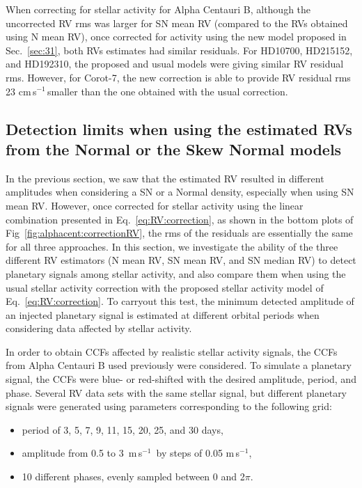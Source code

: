 \documentclass{aa}
\def\ms{\hbox{\,m\,s$^{-1}$}}         %
\def\cms{\hbox{\,cm\,s$^{-1}$}}       %
\begin{document}
When correcting for stellar activity for  Alpha Centauri B, although the uncorrected RV rms was larger for SN mean RV (compared to the RVs obtained using N mean RV), once corrected for activity using the new model proposed in Sec.~\ref{sec:31}, both RVs estimates had similar residuals. 
For HD10700, HD215152, and HD192310, the proposed and usual models were giving similar RV residual rms.
However, for Corot-7, the new correction is able to provide RV residual rms 23\,\cms\,smaller than the one obtained with the usual correction.






\subsection{Detection limits when using the estimated RVs from the Normal or the Skew Normal models} \label{sec:detect_limits}

In the previous section, we saw that the estimated RV resulted in different amplitudes when considering a SN or a Normal density, especially when using SN mean RV. 
However, once corrected for stellar activity using the linear combination presented in Eq.~\eqref{eq:RV:correction}, as shown in the bottom plots of Fig~\ref{fig:alphacent:correctionRV}, the rms of the residuals are essentially the same for all three approaches.
In this section, we investigate the ability of the three different RV estimators (N mean RV, SN mean RV, and SN median RV) to detect planetary signals among stellar activity, and also compare them when using the usual stellar activity correction with the proposed stellar activity model of Eq.~\eqref{eq:RV:correction}.
To carryout this test, the minimum detected amplitude of an injected planetary signal is estimated at different orbital periods when considering data affected by stellar activity.

In order to obtain CCFs affected by realistic stellar activity signals, the CCFs from Alpha Centauri B used previously were considered. 
To simulate a planetary signal, the CCFs were blue- or red-shifted with the desired amplitude, period, and phase.
Several RV data sets with the same stellar signal, but different planetary signals were generated using parameters corresponding to the following grid:
\begin{itemize}
\item period of 3, 5, 7, 9, 11, 15, 20, 25, and 30 days,
\item amplitude from 0.5 to 3 \ms\, by steps of 0.05\,\ms,
\item 10 different phases, evenly sampled between 0 and 2$\pi$.
\end{itemize}
\end{document}
